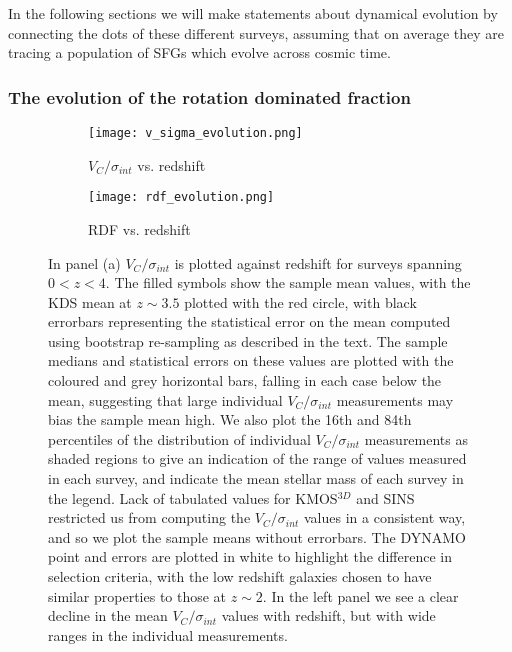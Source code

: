 \documentclass[fleqn,usenatbib]{mn2e}
\begin{document}
In the following sections we will make statements about dynamical evolution by connecting the dots of these different surveys, assuming that on average they are tracing a population of SFGs which evolve across cosmic time. 

\subsubsection{The evolution of the rotation dominated fraction}\label{subsubsec:RDF_evolution}

\begin{figure*}
    \centering \hspace{-1.3cm}
    \begin{subfigure}[h!]{0.5\textwidth}
        \centering
        \texttt{[image: v\_sigma\_evolution.png]}
        \caption{$V_{C}/\sigma_{int}$ vs. redshift}
    \end{subfigure} \hspace{+0.4cm}
    \begin{subfigure}[h!]{0.5\textwidth}
        \centering
        \texttt{[image: rdf\_evolution.png]}
        \caption{RDF vs. redshift}
    \end{subfigure}
    \caption{In panel (a) $V_{C}/\sigma_{int}$ is plotted against redshift for surveys spanning $0 < z < 4$.
    The filled symbols show the sample mean values, with the KDS mean at $z\sim3.5$ plotted with the red circle, with black errorbars representing the statistical error on the mean computed using bootstrap re-sampling as described in the text.
    The sample medians and statistical errors on these values are plotted with the coloured and grey horizontal bars, falling in each case below the mean, suggesting that large individual $V_{C}/\sigma_{int}$ measurements may bias the sample mean high.  
    We also plot the 16th and 84th percentiles of the distribution of individual $V_{C}/\sigma_{int}$ measurements as shaded regions to give an indication of the range of values measured in each survey, and indicate the mean stellar mass of each survey in the legend.
    Lack of tabulated values for KMOS$^{3D}$ and SINS restricted us from computing the $V_{C}/\sigma_{int}$ values in a consistent way, and so we plot the sample means without errorbars.
    The DYNAMO point and errors are plotted in white to highlight the difference in selection criteria, with the low redshift galaxies chosen to have similar properties to those at $z\sim2$.
    In the left panel we see a clear decline in the mean $V_{C}/\sigma_{int}$ values with redshift, but with wide ranges in the individual measurements.
}
\end{figure*}
\end{document}
